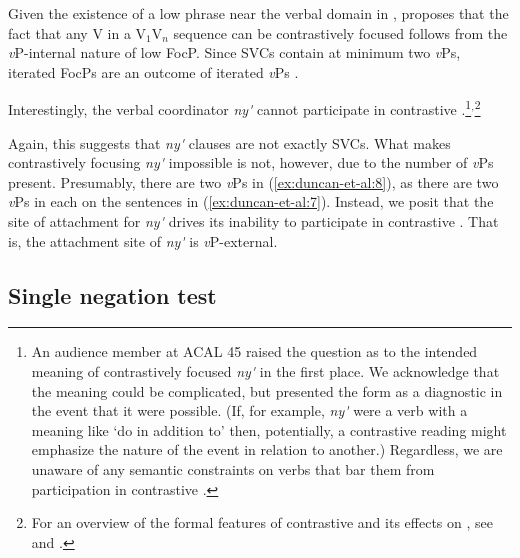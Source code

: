 \documentclass[output=paper,modfonts,nonflat,
colorlinks, citecolor=brown,
]{langsci/langscibook}
\begin{document}
\noindent Given the existence of a low  phrase near the verbal domain in  \citep{duncan-toappear}, \citet{duncan2016parallel} proposes that the fact that any V in a V$_1$V$_n$ sequence can be contrastively focused follows from the \textit{v}P-internal nature of low FocP. Since SVCs contain at minimum two \textit{v}Ps, iterated FocPs are an outcome of iterated \textit{v}Ps \citep[98-100]{duncan2016parallel}. 

Interestingly, the verbal coordinator \textit{ny\'{\textturnv}\ng} cannot participate in contrastive .\footnote{An audience member at ACAL 45 raised the question as to the intended meaning of contrastively focused \textit{ny\'{\textturnv}\ng} in the first place. We acknowledge that the meaning could be complicated, but presented the form as a diagnostic in the event that it were possible. (If, for example, \textit{ny\'{\textturnv}\ng} were a verb with a meaning like `do in addition to' then, potentially, a contrastive  reading might emphasize the nature of the event in relation to another.) Regardless, we are unaware of any semantic constraints on verbs that bar them from participation in contrastive .}$^,$\footnote{For an overview of the formal features of  contrastive  and its effects on , see \citet{akinlabi2003} and \citet{duncan-toappear}.}


 \label{ex:duncan-et-al:8}
\z

\noindent Again, this suggests that \textit{ny\'{\textturnv}\ng} clauses are not exactly SVCs. What makes contrastively focusing \textit{ny\'{\textturnv}\ng} impossible is not, however, due to the number of \textit{v}Ps present. Presumably, there are two \textit{v}Ps in (\ref{ex:duncan-et-al:8}), as there are two \textit{v}Ps in each on the sentences in (\ref{ex:duncan-et-al:7}). Instead, we posit that the site of attachment for \textit{ny\'{\textturnv}\ng} drives its inability to participate in contrastive . That is, the attachment site of \textit{ny\'{\textturnv}\ng} is \textit{v}P-external.

\subsection{Single negation test}\label{sec:duncan-et-al:2.3}
\end{document}
